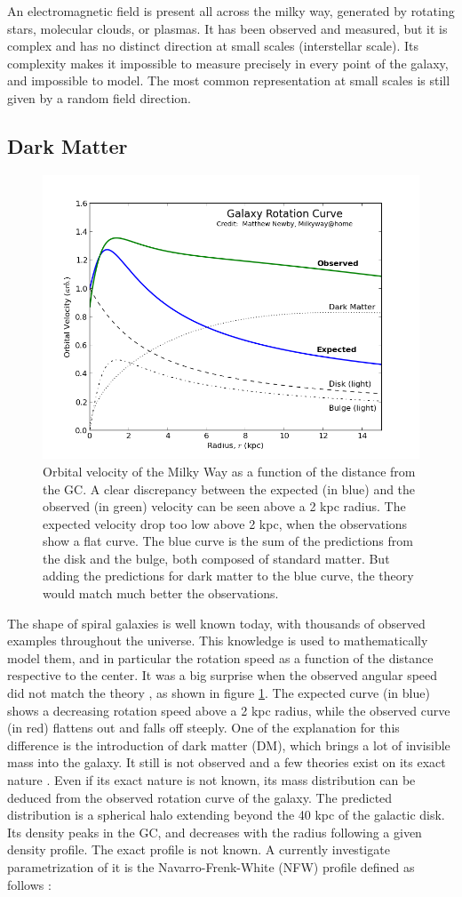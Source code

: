 An electromagnetic field is present all across the milky way, generated by rotating stars, molecular clouds, or plasmas. It has been observed and measured, but it is complex and has no distinct direction at small scales (interstellar scale). Its complexity makes it impossible to measure precisely in every point of the galaxy, and impossible to model. The most common representation at small scales is still given by a random field direction.

\subsection{Dark Matter}

\begin{figure}[h]
 \centering
 \includegraphics[width=.5\linewidth]{pic/theory/gal_rotation_curve.png}
 \caption[Rotation curve of the Milky Way.]{Orbital velocity of the Milky Way as a function of the distance from the GC. A clear discrepancy between the expected (in blue) and the observed (in green) velocity can be seen above a 2 kpc radius. The expected velocity drop too low above 2 kpc, when the observations show a flat curve. The blue curve is the sum of the predictions from the disk and the bulge, both composed of standard matter. But adding the predictions for dark matter to the blue curve, the theory would match much better the observations. \cite{Newby2018} \cite{Rubin1971}}
 \label{fig:gal_rotation_curve}
\end{figure}

The shape of spiral galaxies is well known today, with thousands of observed examples throughout the universe. This knowledge is used to mathematically model them, and in particular the rotation speed as a function of the distance respective to the center. It was a big surprise when the observed angular speed did not match the theory \cite{Rubin1971}, as shown in figure \ref{fig:gal_rotation_curve}. The expected curve (in blue) shows a decreasing rotation speed above a 2 kpc radius, while the observed curve (in red) flattens out and falls off steeply.
One of the explanation for this difference is the introduction of dark matter (DM), which brings a lot of invisible mass into the galaxy. It still is not observed and a few theories exist on its exact nature \cite{Hira2017}. Even if its exact nature is not known, its mass distribution can be deduced from the observed rotation curve of the galaxy. The predicted distribution is a spherical halo extending beyond the 40 kpc of the galactic disk. Its density peaks in the GC, and decreases with the radius following a given density profile. The exact profile is not known. A currently investigate parametrization of it is the Navarro-Frenk-White (NFW) profile defined as follows :

